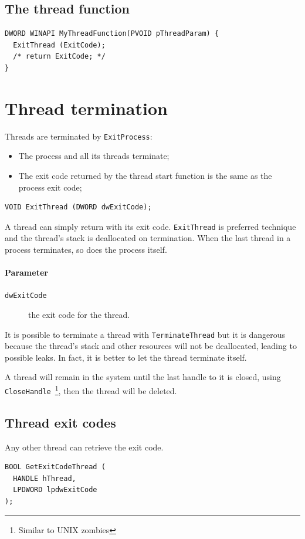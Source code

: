 \subsection{The thread function}
\begin{verbatim}
DWORD WINAPI MyThreadFunction(PVOID pThreadParam) {
  ExitThread (ExitCode);
  /* return ExitCode; */
}
\end{verbatim}

\section{Thread termination}
Threads are terminated by \texttt{ExitProcess}:
\begin{itemize}
\item The process and all its threads terminate;
\item The exit code returned by the thread start function is the same as the process exit code;
\end{itemize}

\begin{verbatim}
VOID ExitThread (DWORD dwExitCode);
\end{verbatim}
A thread can simply return with its exit code. \texttt{ExitThread} is preferred technique and the thread's stack is deallocated on termination. When the last thread in a process terminates, so does the process itself.

\paragraph{Parameter}
\begin{description}
\item [\texttt{dwExitCode}] the exit code for the thread.
\end{description}

It is possible to terminate a thread with \texttt{TerminateThread} but it is dangerous because the thread's stack and other resources will not be deallocated, leading to possible leaks. In fact, it is better to let the thread terminate itself.

A thread will remain in the system until the last handle to it is closed, using \texttt{CloseHandle}~\footnote{Similar to UNIX zombies}, then the thread will be deleted.

\subsection{Thread exit codes}
Any other thread can retrieve the exit code.
\begin{verbatim}
BOOL GetExitCodeThread (
  HANDLE hThread,
  LPDWORD lpdwExitCode
);
\end{verbatim}


